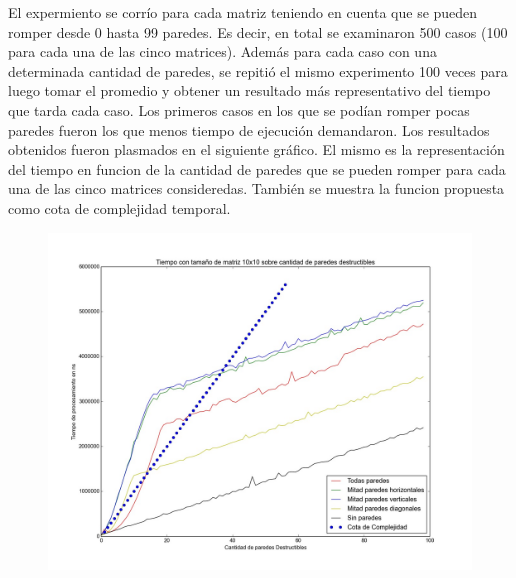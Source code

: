   El expermiento se corrío para cada matriz teniendo en cuenta que se pueden romper desde 0 hasta 99 paredes. Es decir, en total se examinaron 500 casos (100 para cada una de las cinco matrices). Además para cada caso con una determinada cantidad de paredes, se repitió el mismo experimento 100 veces para luego tomar el promedio y obtener un resultado más representativo del tiempo que tarda cada caso. Los primeros casos en los que se podían romper pocas paredes fueron los que menos tiempo de ejecución demandaron.
  Los resultados obtenidos fueron plasmados en el siguiente gráfico. El mismo es la representación del tiempo en funcion de la cantidad de paredes que se pueden romper para cada una de las cinco matrices consideredas. También se muestra la funcion propuesta como cota de complejidad temporal.

  \begin{figure}[H]
      \begin{center}
        \includegraphics[width=0.7\columnwidth]{../exp/ej1tamanosFijos.jpeg}
        \caption{}
      \end{center}
  \end{figure}

